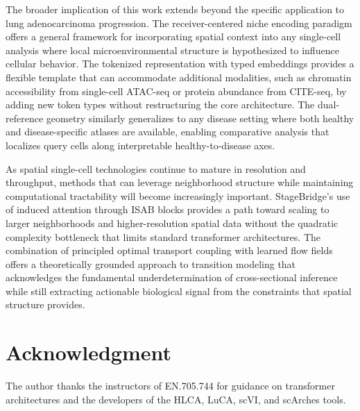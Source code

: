 \documentclass[conference]{IEEEtran}
\begin{document}
The broader implication of this work extends beyond the specific application to lung adenocarcinoma progression. The receiver-centered niche encoding paradigm offers a general framework for incorporating spatial context into any single-cell analysis where local microenvironmental structure is hypothesized to influence cellular behavior. The tokenized representation with typed embeddings provides a flexible template that can accommodate additional modalities, such as chromatin accessibility from single-cell ATAC-seq or protein abundance from CITE-seq, by adding new token types without restructuring the core architecture. The dual-reference geometry similarly generalizes to any disease setting where both healthy and disease-specific atlases are available, enabling comparative analysis that localizes query cells along interpretable healthy-to-disease axes.

As spatial single-cell technologies continue to mature in resolution and throughput, methods that can leverage neighborhood structure while maintaining computational tractability will become increasingly important. StageBridge's use of induced attention through ISAB blocks provides a path toward scaling to larger neighborhoods and higher-resolution spatial data without the quadratic complexity bottleneck that limits standard transformer architectures. The combination of principled optimal transport coupling with learned flow fields offers a theoretically grounded approach to transition modeling that acknowledges the fundamental underdetermination of cross-sectional inference while still extracting actionable biological signal from the constraints that spatial structure provides.

\section*{Acknowledgment}

The author thanks the instructors of EN.705.744 for guidance on transformer architectures and the developers of the HLCA, LuCA, scVI, and scArches tools.



\end{document}
